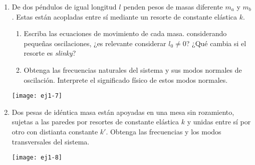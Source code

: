 \documentclass[11pt,spanish,a4paper]{article}
\begin{document}
\begin{enumerate}
\item \label{pendacop}
\begin{minipage}[t][4cm]{0.75\textwidth}
De dos péndulos de igual longitud $l$ penden pesos de masas diferente $m_a$ y $m_b$.
Estas están acopladas entre sí mediante un resorte de constante elástica $k$.
\begin{enumerate}
	\item Escriba las ecuaciones de movimiento de cada masa. considerando pequeñas oscilaciones, ¿es relevante considerar $l_0 \neq 0$?
	¿Qué cambia si el resorte es \emph{slinky}?   
	\item Obtenga las frecuencias naturales del sistema y sus modos normales de oscilación.
	Interprete el significado físico de estos modos normales. 
\end{enumerate}
\end{minipage}
\begin{minipage}[c][0cm][t]{0.2\textwidth}
  \texttt{[image: ej1-7]}
\end{minipage}



\item \label{2masitas}
\begin{minipage}[t][2cm]{0.65\textwidth}
Dos pesas de idéntica masa están apoyadas en una mesa sin rozamiento, sujetas a las paredes por resortes de constante
elástica $k$ y unidas entre sí por otro con distianta constante $k'$.
Obtenga las frecuencias y los modos transversales del sistema. 
\end{minipage}
\begin{minipage}[c][0.5cm][t]{0.3\textwidth}
  \texttt{[image: ej1-8]}
\end{minipage}



\end{enumerate}
\end{document}
